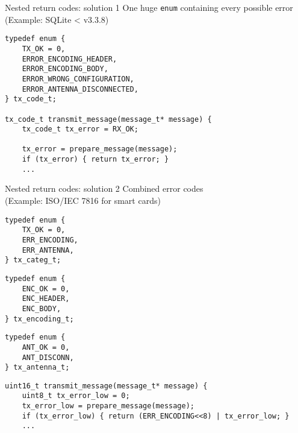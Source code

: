 \documentclass[aspectratio=169,14pt]{beamer}
\begin{document}
\begin{frame}[fragile]{Nested return codes: solution 1}
One huge \texttt{enum} containing every possible error\\
(Example: SQLite < v3.3.8)

\begin{lstlisting}[style=cstyle]
typedef enum {
    TX_OK = 0,
    ERROR_ENCODING_HEADER,
    ERROR_ENCODING_BODY,
    ERROR_WRONG_CONFIGURATION,
    ERROR_ANTENNA_DISCONNECTED,
} tx_code_t;

tx_code_t transmit_message(message_t* message) {
    tx_code_t tx_error = RX_OK;
    
    tx_error = prepare_message(message);
    if (tx_error) { return tx_error; }
    ...
\end{lstlisting}
\end{frame}


\begin{frame}[fragile]{Nested return codes: solution 2}
Combined error codes\\
(Example: ISO/IEC 7816 for smart cards)

\begin{minipage}[t]{0.3\textwidth}
\begin{lstlisting}[style=cstyle]
typedef enum {
    TX_OK = 0,
    ERR_ENCODING,
    ERR_ANTENNA,
} tx_categ_t;
\end{lstlisting}
\end{minipage}
\begin{minipage}[t]{0.3\textwidth}
\begin{lstlisting}[style=cstyle]
typedef enum {
    ENC_OK = 0,
    ENC_HEADER,
    ENC_BODY,
} tx_encoding_t;
\end{lstlisting}
\end{minipage}
\begin{minipage}[t]{0.3\textwidth}
\begin{lstlisting}[style=cstyle]
typedef enum {
    ANT_OK = 0,
    ANT_DISCONN,
} tx_antenna_t;
\end{lstlisting}
\end{minipage}

\begin{lstlisting}[style=cstyle]
uint16_t transmit_message(message_t* message) {
    uint8_t tx_error_low = 0;
    tx_error_low = prepare_message(message);
    if (tx_error_low) { return (ERR_ENCODING<<8) | tx_error_low; }
    ...
\end{lstlisting}
\end{frame}
\end{document}
